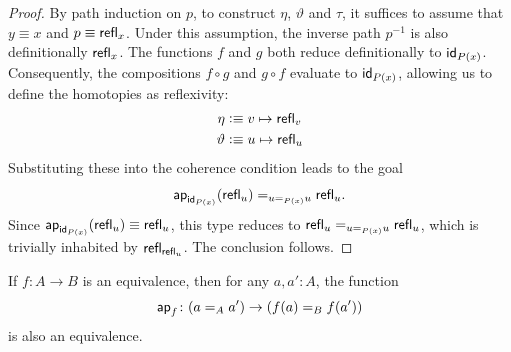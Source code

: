 \begin{proof}
    By path induction on $p$, to construct $\eta$, $\vartheta$ and $\tau$, it suffices to assume that $y\equiv x$ and $p\equiv\mathsf{refl}_x$. Under this assumption, the inverse path $p^{-1}$ is also definitionally $\mathsf{refl}_x$. The functions $f$ and $g$ both reduce definitionally to $\mathsf{id}_{P(x)}$. Consequently, the compositions $f\circ g$ and $g\circ f$ evaluate to $\mathsf{id}_{P(x)}$, allowing us to define the homotopies as reflexivity:
    \begin{align*}
        \eta&\mathrel{\vcentcolon}\equiv v\mapsto\mathsf{refl}_v\\
        \vartheta&\mathrel{\vcentcolon}\equiv u\mapsto\mathsf{refl}_u
    \end{align*}
    Substituting these into the coherence condition leads to the goal
    \[
        \mathsf{ap}_{\mathsf{id}_{P(x)}}(\mathsf{refl}_u)\mathrel{=_{u\mathrel{=_{P(x)}}u}}
            \mathsf{refl}_{u}.
    \]
    Since $\mathsf{ap}_{\mathsf{id}_{P(x)}}(\mathsf{refl}_u)\equiv\mathsf{refl}_u$, this type reduces to $\mathsf{refl}_u\mathrel{=_{u\mathrel{=_{P(x)}}u}}\mathsf{refl}_u$, which is trivially inhabited by $\mathsf{refl}_{\mathsf{refl}_u}$. The conclusion follows.
\end{proof}

\begin{thm}\label{thm:f-equiv-implies-apf-equiv}
    If\/ $f\colon A\to B$ is an equivalence, then for any\/ $a,a'\colon A$, the function
    \[
        \fun{ap}_f\colon(a\eq Aa')\to(f(a)\eq Bf(a'))
    \]
    is also an equivalence.
\end{thm}

